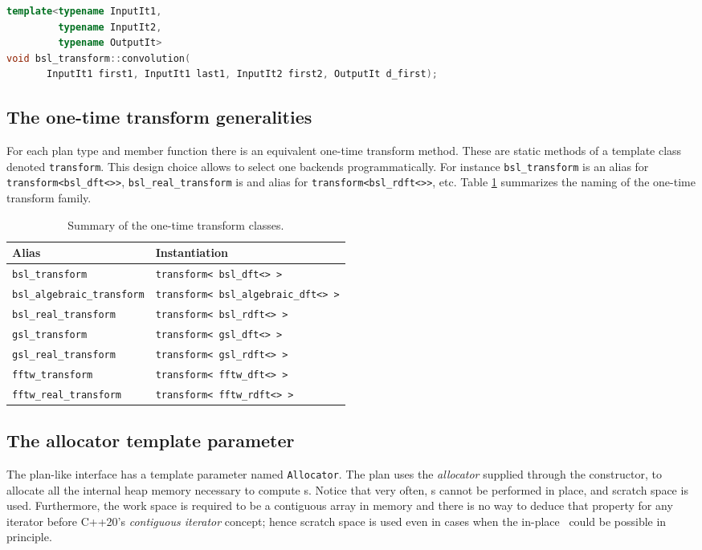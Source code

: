 \begin{lstlisting}[language=C++,caption=Convolution.,label=ls:convolution]
template<typename InputIt1,
         typename InputIt2,
         typename OutputIt>
void bsl_transform::convolution(
       InputIt1 first1, InputIt1 last1, InputIt2 first2, OutputIt d_first);
\end{lstlisting}

\subsection{The one-time transform generalities}
For each plan type and member function there is an equivalent one-time transform
method. These are static methods of a template class denoted \verb|transform|. 
This design choice allows to select one backends programmatically.
For instance \verb|bsl_transform| is an alias for \verb|transform<bsl_dft<>>|,
\verb|bsl_real_transform| is and alias for \verb|transform<bsl_rdft<>>|, etc.
Table \ref{tab:transform} summarizes the naming of the one-time transform family.
\begin{table}[h]
    \centering
    \begin{tabular}{ll}
        Alias & Instantiation \\
        \hline
        \verb|bsl_transform| & \verb|transform< bsl_dft<> >|\\
        \verb|bsl_algebraic_transform| & \verb|transform< bsl_algebraic_dft<> >|\\
        \verb|bsl_real_transform| & \verb|transform< bsl_rdft<> >|\\
        \verb|gsl_transform| & \verb|transform< gsl_dft<> >|\\
        \verb|gsl_real_transform| & \verb|transform< gsl_rdft<> >|\\
        \verb|fftw_transform| & \verb|transform< fftw_dft<> >|\\
        \verb|fftw_real_transform| & \verb|transform< fftw_rdft<> >|\\
    \end{tabular}
    \caption{Summary of the one-time transform classes.}
    \label{tab:transform}
\end{table}

\subsection{The allocator template parameter}\label{subsec:allocators}
The plan-like interface has a template parameter named \verb|Allocator|.
The plan uses the \emph{allocator} supplied through the constructor, to allocate
all the internal heap memory necessary to compute \dft s.
Notice that very often, \dft s cannot be performed in place, and scratch space
is used. Furthermore, the work space is required to be a contiguous array in
memory and there is no way to deduce that property for any iterator before
C++20's \emph{contiguous iterator} concept; hence scratch space is used even in
cases when the in-place \dft\ could be possible in principle.

